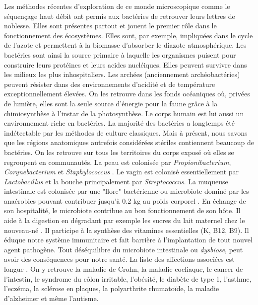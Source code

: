 \documentclass[12pt,a4paper]{article}
\begin{document}
Les méthodes récentes d'exploration de ce monde microscopique comme le séquençage haut débit ont permis aux bactéries de retrouver leurs lettres de noblesse.
Elles sont présentes partout et jouent le premier rôle dans le fonctionnement des écosystèmes. Elles sont, par exemple, impliquées dans le cycle de l'azote et permettent à la biomasse d'absorber le diazote atmosphérique. Les bactéries sont ainsi la source primaire à laquelle les organismes puisent pour construire leurs protéines et leurs acides nucléiques.
Elles peuvent survivre dans les milieux les plus inhospitaliers. Les archées (anciennement archéobactéries) peuvent résister dans des environnements d'acidité et de température exceptionnellement élevées. On les retrouve dans les fonds océaniques où, privées de lumière, elles sont la seule source d'énergie pour la faune grâce à la chimiosynthèse à l'instar de la photosynthèse. 
Le corps humain est lui aussi un environnement riche en bactéries. La majorité des bactéries a longtemps été indétectable par les méthodes de culture classiques. Mais à présent, nous savons que les régions anatomiques autrefois considérées stériles contiennent beaucoup de bactéries. 
On les retrouve sur tous les territoires du corps exposé où elles se regroupent en communautés.
La peau est colonisée par \textit{Propionibacterium}, \textit{Corynebacterium} et \textit{Staphylococcus} \cite{Yong2017}. Le vagin est colonisé essentiellement par \textit{Lactobacillus} et la bouche principalement par \textit{Streptococcus}\cite{Yong2017}.
La muqueuse intestinale est colonisée par une "flore" bactérienne ou microbiote dominé par les anaérobies pouvant contribuer jusqu'à 0.2 kg au poids corporel \citep{Sender2016}.
En échange de son hospitalité, le microbiote contribue au bon fonctionnement de son hôte. Il aide à la digestion en dégradant par exemple les sucres du lait maternel chez le nouveau-né \cite{Bode2012,Yong2017}. Il participe à la synthèse des vitamines essentielles (K, B12, B9)\cite{LeBlanc2013,Yong2017}. Il éduque notre système immunitaire et fait barrière à l'implantation de tout nouvel agent pathogène.
Tout déséquilibre du microbiote intestinale ou \textit{dysbiose}, peut avoir des conséquences pour notre santé. La liste des affections associées est longue \cite{Yong2017}. On y retrouve la maladie de Crohn, la maladie coeliaque, le cancer de l’intestin, le syndrome du côlon irritable, l’obésité, le diabète de type 1, l’asthme, l’eczéma, la sclérose en plaques, la polyarthrite rhumatoïde, la maladie d’alzheimer et même l’autisme. \\
\end{document}

